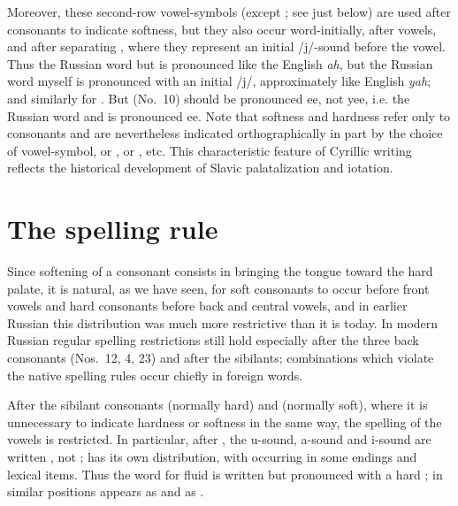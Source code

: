 Moreover, these second-row vowel-symbols (except ; see just below) are used after consonants to indicate softness, but they also occur word-initially, after vowels, and after separating , where they represent an initial /j/-sound before the vowel. Thus the Russian word  but is pronounced like the English \emph{ah}, but the Russian word  myself is pronounced with an initial /j/, approximately like English \emph{yah}; and similarly for . But  (No.~10) should be pronounced ee, not yee, i.e. the Russian word  and is pronounced ee. Note that softness and hardness refer only to consonants and are nevertheless indicated orthographically in part by the choice of vowel-symbol,  or ,  or , etc. This characteristic feature of Cyrillic writing reflects the historical development of Slavic palatalization and iotation.

\section{The spelling rule}

Since softening of a consonant consists in bringing the tongue toward the hard palate, it is natural, as we have seen, for soft consonants to occur before front vowels and hard consonants before back and central vowels, and in earlier Russian this distribution was much more restrictive than it is today. In modern Russian regular spelling restrictions still hold especially after the three back consonants  (Nos.~12, 4, 23) and after the sibilants; combinations which violate the native spelling rules occur chiefly in foreign words.

After the sibilant consonants  (normally hard) and  (normally soft), where it is unnecessary to indicate hardness or softness in the same way, the spelling of the vowels is restricted. In particular, after , the u-sound, a-sound and i-sound are written , not ;  has its own distribution, with  occurring in some endings and lexical items. Thus the word for fluid is written  but pronounced with a hard ; in similar positions  appears as  and  as .

